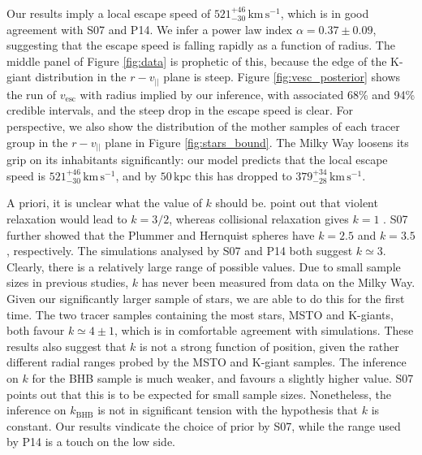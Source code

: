 \documentclass[useAMS,twocolumn,usenatbib]{mn2e}
\def\kpc{{\,\mathrm{kpc}}}
\def\kms{{\,\mathrm{km\,s^{-1}}}}
\def\vlos{{v_{||}}}
\def\vesc{{v_\mathrm{esc}}}
\begin{document}
Our results imply a local escape speed of $521^{+46}_{-30}\kms$, which is in good agreement with S07 and P14.  
We infer a power law index $\alpha = 0.37\pm0.09$, suggesting that the escape speed is falling rapidly as a function of radius.
The middle panel of Figure \ref{fig:data} is prophetic of this, because the edge of the K-giant distribution in the $r-\vlos$ plane is steep.
Figure \ref{fig:vesc_posterior} shows the run of $\vesc$ with radius implied by our inference, with associated 68\% and 94\% credible intervals, and the steep drop in the escape speed is clear.
For perspective, we also show the distribution of the mother samples of each tracer group in the $r-\vlos$ plane in Figure \ref{fig:stars_bound}.
The Milky Way loosens its grip on its inhabitants significantly: our model predicts that the local escape speed is $521^{+46}_{-30}\kms$, and by $50\kpc$ this has dropped to $379^{+34}_{-28}\kms$.

A priori, it is unclear what the value of $k$ should be. 
\citet{Le90} point out that violent relaxation would lead to $k=3/2$, whereas collisional relaxation gives $k=1$ \citep{Sp72}. 
S07 further showed that the Plummer and Hernquist spheres \citep{BT08} have $k=2.5$ and $k=3.5$, respectively. 
The simulations analysed by S07 and P14 both suggest $k\simeq3$. 
Clearly, there is a relatively large range of possible values.  
Due to small sample sizes in previous studies, $k$ has never been measured from data on the Milky Way. 
Given our significantly larger sample of stars, we are able to do this for the first time. 
The two tracer samples containing the most stars, MSTO and K-giants, both favour $k\simeq4\pm1$, which is in comfortable agreement with simulations.
These results also suggest that $k$ is not a strong function of position, given the rather different radial ranges probed by the MSTO and K-giant samples.
The inference on $k$ for the BHB sample is much weaker, and favours a slightly higher value. 
S07 points out that this is to be expected for small sample sizes. 
Nonetheless, the inference on $k_\mathrm{BHB}$ is not in significant tension with the hypothesis that $k$ is constant. 
Our results vindicate the choice of prior by S07, while the range used by P14 is a touch on the low side.
\end{document}
